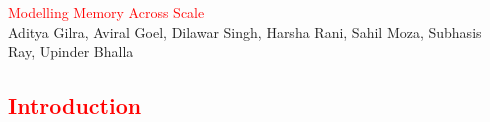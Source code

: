 \documentclass[a0paper,12pt]{article}
\def\tikzoverlay{%
   \tikz[baseline,overlay]\node[draw=white,every overlay node]
}%
\begin{document}

%

\begin{minipage}{\textwidth}
    \centering
    \fontsize{4cm}{1em}\selectfont \textcolor{red}{Modelling Memory Across Scale}
    \\
    \fontsize{1.5cm}{1em}\selectfont Aditya Gilra, Aviral Goel, Dilawar Singh,
    Harsha Rani, Sahil Moza, Subhasis Ray, Upinder Bhalla
\end{minipage}


\vspace{5cm}
\setlength{\columnsep}{6cm}
\begin{multicols}{3}
    \section*{\HUGE \textcolor{red}{Introduction}}
\HUGE





\end{multicols}
\end{document}
